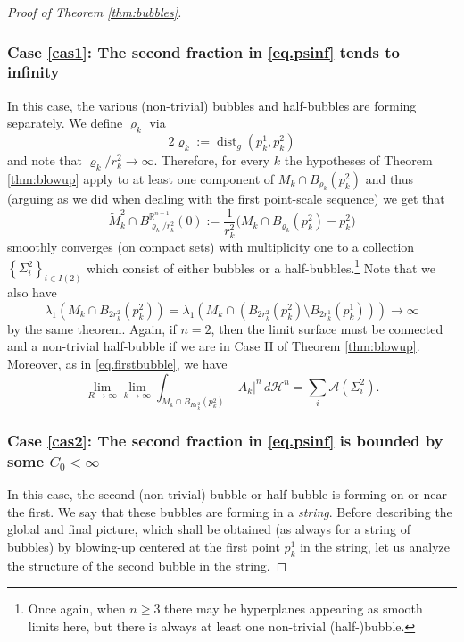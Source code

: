 \documentclass[10pt]{amsart}
\let\mathcal\mathscr
\newcounter{cas}
\DeclareMathOperator{\dist}{dist}
\theoremstyle{definition}
\newcommand{\R}{\mathbb{R}}
\newcommand{\h}{\mathscr{H}}
\begin{document}
\begin{proof}[Proof of Theorem \ref{thm:bubbles}]
\subsubsection*{\label{cas1}Case \ref{cas1}: The second fraction in \eqref{eq.psinf} tends to infinity} In this case, the various (non-trivial) bubbles and half-bubbles are forming separately. We define $\varrho_k$ via
$$2\varrho_k:= \dist_g(p^1_k,p^2_k)$$ and note that $\varrho_k/r^2_k\to \infty$. Therefore, for every $k$ the hypotheses of Theorem \ref{thm:blowup} apply to at least one component of $M_k\cap B_{\varrho_k}(p^2_k)$ and thus (arguing as we did when dealing with the first point-scale sequence) we get that
\begin{equation*}
\widetilde{M}_k^2 \cap B^{\R^{n+1}}_{\varrho_k/r^2_k}(0) := \frac{1}{r^2_k}\big(M_k\cap B_{\varrho_k}(p^2_k)- p^2_k\big)
\end{equation*}
smoothly converges (on compact sets) with multiplicity one to a collection $\left\{\Sigma^2_i\right\}_{i\in I(2)}$ which consist of either bubbles or a half-bubbles.\footnote{Once again, when $n\geq 3$ there may be hyperplanes appearing as smooth limits here, but there is always at least one non-trivial (half-)bubble.} Note that we also have
$$\lambda_1(M_k\cap B_{2r^2_k}(p^2_k))=\lambda_1(M_k\cap (B_{2r^2_k}(p^2_k)\setminus B_{2r^1_k}(p^1_k)))\to \infty$$ by the same theorem. Again, if $n=2$, then the limit surface must be connected and a non-trivial half-bubble if we are in Case II of Theorem \ref{thm:blowup}. Moreover, as in \eqref{eq.firstbubble}, we have
\begin{equation}\label{eq.secbubble1}
\lim_{R\to \infty} \lim_{k\to \infty} \int_{M_k\cap B_{Rr^2_k}(p^2_k)} |A_k|^n \, d\h^n =\sum_i \mathcal{A}(\Sigma^2_i).
\end{equation}

\subsubsection*{\label{cas2}Case \ref{cas2}: The second fraction in \eqref{eq.psinf} is bounded by some $C_0<\infty$}
In this case, the second (non-trivial) bubble or half-bubble is forming on or near the first. We say that these bubbles are forming in a \emph{string}. Before describing the global and final picture, which shall be obtained (as always for a string of bubbles) by blowing-up centered at the first point $p^1_k$ in the string, let us analyze the structure of the second bubble in the string.


\end{proof}
\end{document}
